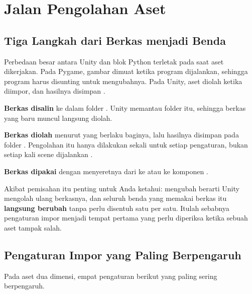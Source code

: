 \section{Jalan Pengolahan Aset}
\label{sec:pipeline-impor}

\subsection{Tiga Langkah dari Berkas menjadi Benda}

Perbedaan besar antara Unity dan blok Python terletak pada saat aset
dikerjakan. Pada Pygame, gambar dimuat ketika program dijalankan, sehingga
program harus disunting untuk mengubahnya. Pada Unity, aset diolah ketika
diimpor, dan hasilnya disimpan \cite{unity-manual-import}.

\begin{langkah}
  \item \textbf{Berkas disalin} ke dalam folder . Unity memantau
        folder itu, sehingga berkas yang baru muncul langsung diolah.
  \item \textbf{Berkas diolah} menurut  yang berlaku
        baginya, lalu hasilnya disimpan pada folder . Pengolahan
        itu hanya dilakukan sekali untuk setiap pengaturan, bukan setiap kali
        scene dijalankan \cite{unity-manual-import}.
  \item \textbf{Berkas dipakai} dengan menyeretnya dari  ke  atau ke komponen .
\end{langkah}

Akibat pemisahan itu penting untuk Anda ketahui: mengubah  berarti Unity mengolah ulang berkasnya, dan seluruh benda yang memakai
berkas itu \textbf{langsung berubah} tanpa perlu disentuh satu per satu. Itulah
sebabnya pengaturan impor menjadi tempat pertama yang perlu diperiksa ketika
sebuah aset tampak salah.

\subsection{Pengaturan Impor yang Paling Berpengaruh}

Pada aset dua dimensi, empat pengaturan berikut yang paling sering berpengaruh.

